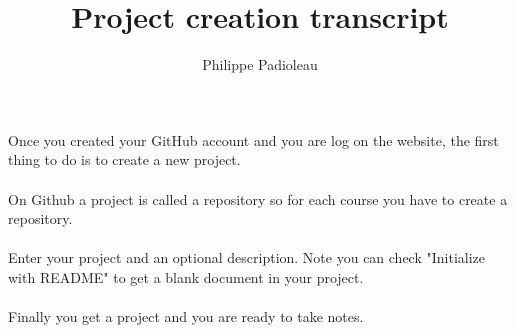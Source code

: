 \documentclass{article}
\title{Project creation transcript}
\author{Philippe Padioleau}
\date{}
\begin{document}
\maketitle

Once you created your GitHub account and you are log on the website, 
the first thing to do is to create a new project.
\\\\
On Github a project is called a repository so for each course you have to 
create a repository.
\\\\
Enter your project and an optional description. 
Note you can check "Initialize with README" to get a blank document in your project.
\\\\
Finally you get a project and you are ready to take notes.
\end{document}
